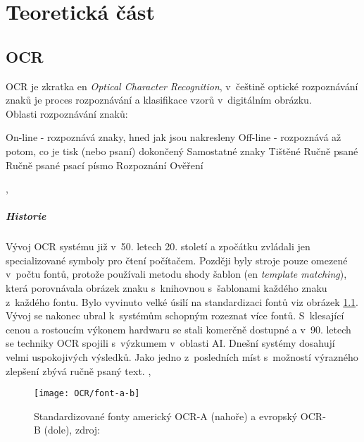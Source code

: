 \documentclass[12pt]{report}			%
\begin{document}
		
	
	\part{Teoretická část}
	\chapter{OCR}
	\label{sec:OCR}	
	OCR je zkratka \gls{en} \emph{Optical Character Recognition}, v~češtině optické rozpoznávání znaků \parencite{wiki:OCR} je proces rozpoznávání a klasifikace vzorů v~digitálním obrázku.\parencite[\gls{s} 9]{chaudhuri2017optical}\\
	Oblasti rozpoznávání znaků:
	\begin{outline}
	 	\1 On-line - rozpoznává znaky, hned jak jsou nakresleny
     	\1 Off-line - rozpoznává až potom, co je tisk (nebo psaní) dokončený
     		\2 Samostatné znaky
     			\3 Tištěné
     			\3	Ručně psané
     		\2 Ručně psané psací písmo
     			\3 Rozpoznání
     			 \3 Ověření
	\end{outline}
	\parencite[\gls{str} 12]{chaudhuri2017optical}, \parencite[\gls{str} 7]{eikvil-ocr}

	\subsubsection{Historie}
	\label{sec:OCR-history}
	 Vývoj \gls{OCR} systému již v~50. letech 20. století a zpočátku zvládali jen specializované symboly pro čtení počítačem. Později byly stroje pouze omezené v~počtu fontů, protože používali metodu shody šablon (\gls{en}  \emph{template matching}), která porovnávala obrázek znaku s~knihovnou s~šablonami každého znaku z~každého fontu. Bylo vyvinuto velké úsilí na standardizaci fontů \gls{viz} obrázek \ref{fig:ocr-font}. Vývoj se nakonec ubral k~systémům schopným rozeznat více fontů. S~klesající cenou a rostoucím výkonem hardwaru se stali komerčně dostupné a v~90. letech se techniky \gls{OCR} spojili s~výzkumem v~oblasti \gls{AI}. Dnešní systémy dosahují velmi uspokojivých výsledků. Jako jedno z~posledních míst s~možností výrazného zlepšení zbývá ručně psaný text. \parencite[\gls{s} 8-10]{eikvil-ocr}, \parencite[\gls{s} 15]{chaudhuri2017optical}
	\begin{figure}[h]
	\centering
	\texttt{[image: OCR/font-a-b]}
	\caption{Standardizované fonty americký OCR-A (nahoře) a evropský OCR-B (dole), zdroj: \parencite[\gls{str} 9]{eikvil-ocr}}
	\label{fig:ocr-font}
	\end{figure}
		
\end{document}
